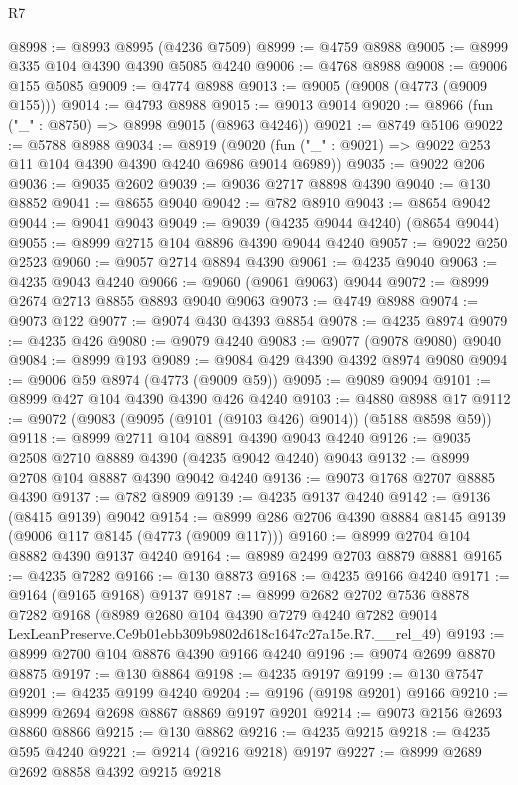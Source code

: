 \begin{lexlean}{R7}
\begin{coremodule}
@8998 := @8993 @8995 (@4236 @7509)
@8999 := @4759 @8988
@9005 := @8999 @335 @104 @4390 @4390 @5085 @4240
@9006 := @4768 @8988
@9008 := @9006 @155 @5085
@9009 := @4774 @8988
@9013 := @9005 (@9008 (@4773 (@9009 @155)))
@9014 := @4793 @8988
@9015 := @9013 @9014
@9020 := @8966 (fun ("_" : @8750) => @8998 @9015 (@8963 @4246))
@9021 := @8749 @5106
@9022 := @5788 @8988
@9034 := @8919
    (@9020 (fun ("_" : @9021) => @9022 @253 @11 @104 @4390 @4390 @4240 @6986 @9014 @6989))
@9035 := @9022 @206
@9036 := @9035 @2602
@9039 := @9036 @2717 @8898 @4390
@9040 := @130 @8852
@9041 := @8655 @9040
@9042 := @782 @8910
@9043 := @8654 @9042
@9044 := @9041 @9043
@9049 := @9039 (@4235 @9044 @4240) (@8654 @9044)
@9055 := @8999 @2715 @104 @8896 @4390 @9044 @4240
@9057 := @9022 @250 @2523
@9060 := @9057 @2714 @8894 @4390
@9061 := @4235 @9040
@9063 := @4235 @9043 @4240
@9066 := @9060 (@9061 @9063) @9044
@9072 := @8999 @2674 @2713 @8855 @8893 @9040 @9063
@9073 := @4749 @8988
@9074 := @9073 @122
@9077 := @9074 @430 @4393 @8854
@9078 := @4235 @8974
@9079 := @4235 @426
@9080 := @9079 @4240
@9083 := @9077 (@9078 @9080) @9040
@9084 := @8999 @193
@9089 := @9084 @429 @4390 @4392 @8974 @9080
@9094 := @9006 @59 @8974 (@4773 (@9009 @59))
@9095 := @9089 @9094
@9101 := @8999 @427 @104 @4390 @4390 @426 @4240
@9103 := @4880 @8988 @17
@9112 := @9072 (@9083 (@9095 (@9101 (@9103 @426) @9014)) (@5188 @8598 @59))
@9118 := @8999 @2711 @104 @8891 @4390 @9043 @4240
@9126 := @9035 @2508 @2710 @8889 @4390 (@4235 @9042 @4240) @9043
@9132 := @8999 @2708 @104 @8887 @4390 @9042 @4240
@9136 := @9073 @1768 @2707 @8885 @4390
@9137 := @782 @8909
@9139 := @4235 @9137 @4240
@9142 := @9136 (@8415 @9139) @9042
@9154 := @8999 @286 @2706 @4390 @8884 @8145 @9139 (@9006 @117 @8145 (@4773 (@9009 @117)))
@9160 := @8999 @2704 @104 @8882 @4390 @9137 @4240
@9164 := @8989 @2499 @2703 @8879 @8881
@9165 := @4235 @7282
@9166 := @130 @8873
@9168 := @4235 @9166 @4240
@9171 := @9164 (@9165 @9168) @9137
@9187 := @8999
    @2682
    @2702
    @7536
    @8878
    @7282
    @9168
    (@8989
      @2680
      @104
      @4390
      @7279
      @4240
      @7282
      @9014
      LexLeanPreserve.Ce9b01ebb309b9802d618c1647c27a15e.R7.__rel_49)
@9193 := @8999 @2700 @104 @8876 @4390 @9166 @4240
@9196 := @9074 @2699 @8870 @8875
@9197 := @130 @8864
@9198 := @4235 @9197
@9199 := @130 @7547
@9201 := @4235 @9199 @4240
@9204 := @9196 (@9198 @9201) @9166
@9210 := @8999 @2694 @2698 @8867 @8869 @9197 @9201
@9214 := @9073 @2156 @2693 @8860 @8866
@9215 := @130 @8862
@9216 := @4235 @9215
@9218 := @4235 @595 @4240
@9221 := @9214 (@9216 @9218) @9197
@9227 := @8999 @2689 @2692 @8858 @4392 @9215 @9218

\end{coremodule}
\end{lexlean}
